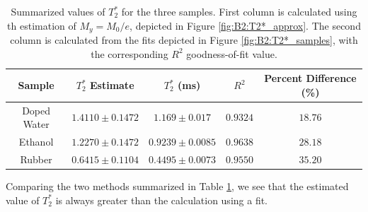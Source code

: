 \begin{table}[H]
    \centering
    \begin{tabular}{c|c|c|c|c}
    \toprule
    \textbf{Sample} & $T_2^*$ Estimate & $T_2^*$ (ms) & $R^2$ & Percent Difference (\%) \\ \midrule
        Doped Water & $1.4110\pm0.1472$ & $1.169 \pm 0.017$ & $0.9324$  & $18.76$\\
        Ethanol & $1.2270\pm0.1472$ & $0.9239 \pm 0.0085$ & $0.9638$ & $28.18$\\
        Rubber & $0.6415\pm0.1104$ & $0.4495 \pm 0.0073$ & $0.9550$  & $35.20$ \\ \bottomrule
    \end{tabular}
    \caption{Summarized values of $T_2^*$ for the three samples. First column is calculated using th estimation of $M_y=M_0/e$, depicted in Figure \ref{fig:B2:T2*_approx}. The second column is calculated from the fits depicted in Figure \ref{fig:B2:T2*_samples}, with the corresponding $R^2$ goodness-of-fit value.}
    \label{tab:B2:T2*_values}
\end{table}

Comparing the two methods summarized in Table \ref{tab:B2:T2*_values}, we see that the estimated value of $T_2^*$ is always greater than the calculation using a fit. 


